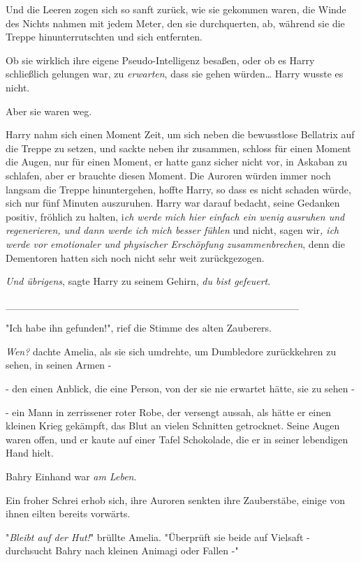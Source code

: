 {Und die Leeren zogen sich so sanft zurück, wie sie gekommen waren, die Winde des Nichts nahmen mit jedem Meter, den sie durchquerten, ab, während sie die Treppe hinunterrutschten und sich entfernten.

Ob sie wirklich ihre eigene Pseudo-Intelligenz besaßen, oder ob es Harry schließlich gelungen war, zu \emph{erwarten}, dass sie gehen würden… Harry wusste es nicht.

Aber sie waren weg.

Harry nahm sich einen Moment Zeit, um sich neben die bewusstlose Bellatrix auf die Treppe zu setzen, und sackte neben ihr zusammen, schloss für einen Moment die Augen, nur für einen Moment, er hatte ganz sicher nicht vor, in Askaban zu schlafen, aber er brauchte diesen Moment. Die Auroren würden immer noch langsam die Treppe hinuntergehen, hoffte Harry, so dass es nicht schaden würde, sich nur fünf Minuten auszuruhen. Harry war darauf bedacht, seine Gedanken positiv, fröhlich zu halten, i\emph{ch werde mich hier einfach ein wenig} \emph{ausruhen und} \emph{regenerieren, und dann werde ich mich besser fühlen} und nicht, sagen wir\emph{, ich werde vor emotionaler und physischer Erschöpfung zusammenbrechen}, denn die Dementoren hatten sich noch nicht sehr weit zurückgezogen.

\emph{Und übrigens}, sagte Harry zu seinem Gehirn, \emph{du bist gefeuert}.

\_\_\_\_\_\_\_\_\_\_\_\_\_\_\_\_\_\_\_\_\_\_\_\_\_\_\_\_\_\_\_\_\_\_\_\_\_\_\_\_

"Ich habe ihn gefunden!", rief die Stimme des alten Zauberers.

\emph{Wen?} dachte Amelia, als sie sich umdrehte, um Dumbledore zurückkehren zu sehen, in seinen Armen -

- den einen Anblick, die eine Person, von der sie nie erwartet hätte, sie zu sehen -

- ein Mann in zerrissener roter Robe, der versengt aussah, als hätte er einen kleinen Krieg gekämpft, das Blut an vielen Schnitten getrocknet. Seine Augen waren offen, und er kaute auf einer Tafel Schokolade, die er in seiner lebendigen Hand hielt.

Bahry Einhand war \emph{am Leben}.

Ein froher Schrei erhob sich, ihre Auroren senkten ihre Zauberstäbe, einige von ihnen eilten bereits vorwärts.

"\emph{Bleibt auf der Hut!}" brüllte Amelia. "Überprüft sie beide auf Vielsaft - durchsucht Bahry nach kleinen Animagi oder Fallen -"

}
